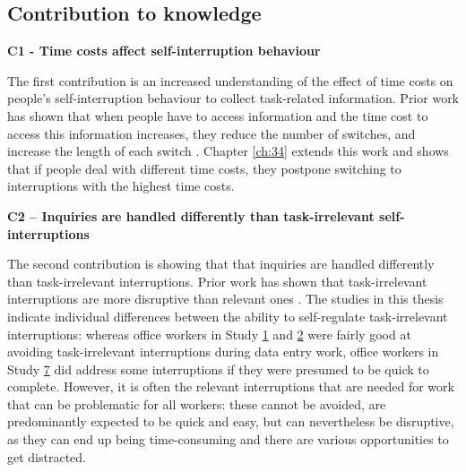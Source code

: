 

\subsection{Contribution to knowledge}
\textbf{C1 - Time costs affect self-interruption behaviour}

The first contribution is an increased understanding of the effect of time costs on people’s self-interruption behaviour to collect task-related information. Prior work has shown that when people have to access information and the time cost to access this information increases, they reduce the number of switches, and increase the length of each switch \citep{Gray2006}. Chapter \ref{ch:34} extends this work and shows that if people deal with different time costs, they postpone switching to interruptions with the highest time costs. 

\textbf{C2 – Inquiries are handled differently than task-irrelevant self-interruptions}

The second contribution is showing that that inquiries are handled differently than task-irrelevant interruptions. Prior work has shown that task-irrelevant interruptions are more disruptive than relevant ones \citep{Iqbal2008}. The studies in this thesis indicate individual differences between the ability to self-regulate task-irrelevant interruptions: whereas office workers in Study \hyperref[st:Study1]{1} and \hyperref[st:Study2]{2} were fairly good at avoiding task-irrelevant interruptions during data entry work, office workers in Study \hyperref[st:Study7]{7} did address some interruptions if they were presumed to be quick to complete. However, it is often the relevant interruptions that are needed for work that can be problematic for all workers: these cannot be avoided, are predominantly expected to be quick and easy, but can nevertheless be disruptive, as they can end up being time-consuming and there are various opportunities to get distracted. 

